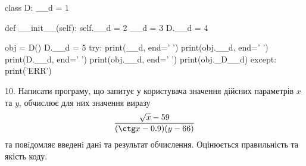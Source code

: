 \documentclass[11pt]{article}
\begin{document}
class D:
    __d = 1
    
    def __init__(self):
        self.__d = 2
        __d = 3
        D.__d = 4

obj = D()
D.__d = 5
try:
    print(__d, end=' ')
    print(obj.__d, end=' ')
    print(D.__d, end=' ')
    print(obj.__d, end=' ')
    print(obj._D__d)
except:
    print('ERR')
\par\vspace{5mm}
10. 
Написати програму, що запитує у користувача значення дійсних параметрів $x$ та $y$, обчислює для них значення виразу 
$$\frac{\sqrt x - 59}{(\ctg x - 0.9) (y - 66)}$$ 
та повiдомляє введенi данi та результат обчислення.
 Оцінюється правильність та якість коду.

\par\vspace{5mm}










\newpage
\end{document}
